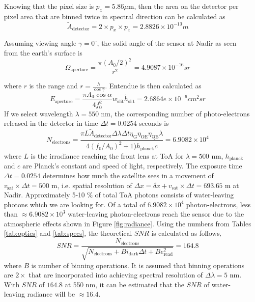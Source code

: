 Knowing that the pixel size is $p_x=5.86 \mu$m, then the area on the detector per pixel area that are binned twice in spectral direction can be calculated as
\begin{equation}
\tilde{A}_{\text{detector}} = 2\times p_x\times p_x = 2.8826 \times 10^{-10} m
\end{equation}

\noindent Assuming viewing angle $\gamma = 0^{\circ}$, the solid angle of the sensor at Nadir as seen from the earth's surface is
\begin{equation}
\Omega_{\text{aperture}} = \frac{\pi (A_0/2)^2}{r^2} = 4.9087 \times 10^{-16} sr
\end{equation}

\noindent where $r$ is the range and $r=\frac{h}{\cos{\gamma}}$. Entendue is then calculated as
\begin{equation}
E_{\text{aperture}} = \frac{\pi A_0 \cos \alpha}{4 f_0^2}w_{\text{slit}} \tilde{h}_{\text{slit}} = 2.6864e \times 10^{-6} cm^2 sr
\end{equation}
\noindent If we select wavelength $\lambda = 550$ nm, the corresponding number of photo-electrons released in the detector in time $\Delta t = 0.0254 $ seconds is
\begin{equation}
N_{\text{electrons}} = \frac{\pi L \tilde{A}_{\text{detector}} \Delta\lambda \Delta t \eta_{\text{G}} \eta_{\text{OE}} \eta_{\text{QE}} \lambda}{4(f_0/A_0)^2+1)h_{\text{planck}} c} = 6.9082\times10^{4}
\end{equation}
\noindent where $L$ is the irradiance reaching the front lens at ToA for $\lambda = 500$ nm, $h_{\text{planck}}$ and $c$ are Planck's constant and speed of light, respectively. The exposure time $\Delta t = 0.0254 $ determines how much the satellite sees in a movement of $v_{\text{sat}}\times \Delta t =500$ m, i.e. spatial resolution of $\Delta x = \delta x + v_{\text{sat}}\times \Delta t = 693.65$ m at Nadir. Approximately 5-10 \% of total ToA photons consists of water-leaving photons which we are looking for. Of a total of $6.9082\times10^{4}$ photon-electrons, less than $\approx 6.9082\times10^{3}$ water-leaving photon-electrons reach the sensor due to the atmospheric effects shown in Figure \ref{fig:radiance}.  Using the numbers from Tables \ref{tab:optics} and \ref{tab:specs}, the theoretical $SNR$ is calculated as follows,
\begin{equation}
SNR = \frac{N_{\text{electrons}}}{\sqrt{N_{\text{electrons}}+B i_{\text{dark}} \Delta t+B e_{\text{read}}^2}} = 164.8
\end{equation}
\noindent where $B$ is number of binning operations. It is assumed that binning operations are $2\times$ that are incorporated into achieving spectral resolution of $\Delta \lambda=5$ nm. With $SNR$ of $164.8$ at 550 nm, it can be estimated that the $SNR$ of water-leaving radiance will be $\approx 16.4$.

